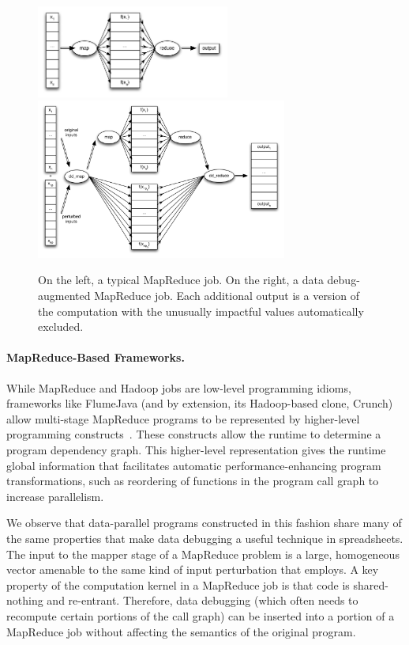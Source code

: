 \begin{figure}[t]
	\includegraphics[width=2.5in]{images/mapreduce}
  \hfill
	\includegraphics[width=3.25in]{images/mapreduce_dd}
	\caption{
		On the left, a typical MapReduce job.  On the right, a data debug-augmented MapReduce job.  Each additional output is a version of the computation with the unusually impactful values automatically excluded.\label{fig:mapreduce_pipeline}
	}
\end{figure}

\paragraph{MapReduce-Based Frameworks.}
While MapReduce and Hadoop jobs are low-level programming idioms,
frameworks like FlumeJava (and by extension, its Hadoop-based clone, Crunch)
allow multi-stage MapReduce programs to be represented by higher-level
programming constructs~\cite{pldi:flumejava}.  These constructs allow
the runtime to determine a program dependency graph.  This
higher-level representation gives the runtime global information that
facilitates automatic performance-enhancing program transformations,
such as reordering of functions in the program call graph to increase
parallelism.

We observe that data-parallel programs constructed in this fashion
share many of the same properties that make data debugging a useful
technique in spreadsheets.  The input to the mapper stage of a
MapReduce problem is a large, homogeneous vector amenable to the same
kind of input perturbation that \checkcell{} employs.  A key property
of the computation kernel in a MapReduce job is that code is
shared-nothing and re-entrant. Therefore, data debugging (which often
needs to recompute certain portions of the call graph) can be inserted
into a portion of a MapReduce job without affecting the semantics of
the original program.


